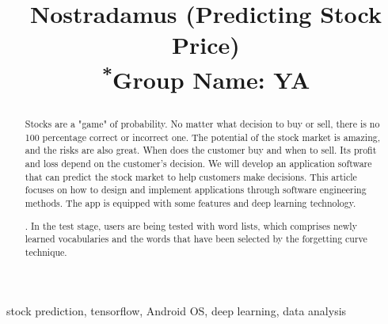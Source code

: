 \documentclass[conference]{IEEEtran}
\begin{document}
\title{Nostradamus (Predicting Stock Price) \\
{\footnotesize \textsuperscript{*}Group Name: YA}

}

\author{
\and
{}
}

\maketitle

\begin{abstract}
Stocks are a "game" of probability. No matter what decision to buy or sell, there is no 100 percentage correct or incorrect one. The potential of the stock market is amazing, and the risks are also great. When does the customer buy and when to sell. Its profit and loss depend on the customer's decision. We will develop an application software that can predict the stock market to help customers make decisions. This article focuses on how to design and implement applications through software engineering methods. The app is equipped with some features and deep learning technology. \begin{comment}and showing the nuance of the word with color\end{comment}. In the test stage, users are being tested with word lists, which comprises newly learned vocabularies and the words that have been selected by the forgetting curve technique.
\end{abstract}

\begin{IEEEkeywords}
stock prediction, tensorflow, Android OS, deep learning, data analysis
\end{IEEEkeywords}
\end{document}
